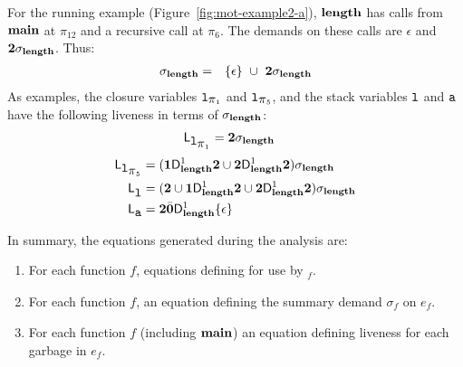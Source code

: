 \documentclass[9pt]{sigplanconf}
\begin{document}


For  the  running  example (Figure~\ref{fig:mot-example2-a}),  $\mathbf{length}$  has  calls  from  $\mathbf{main}$  at
$\pi_{12}$ and a recursive call at $\pi_6$. The demands on these calls
are $\epsilon$ and ${\mathbf{2}}\sigma_{\mathit{\mathbf{length}}}$. Thus:
\begin{eqnarray*}
\sigma_{\mathbf{length}}    &=&
 \{\epsilon\}  ~\cup~{{\mathbf{2}}\sigma_{\mathit{\mathbf{length}}}}
\end{eqnarray*}
As examples, the closure variables $\mbox{\tt l}_{\mbox{$\pi$}_1}$ and $\mbox{\tt l}_{\mbox{$\pi$}_5}$, and the
stack variables $\mbox{\tt l}$ and $\mbox{\tt a}$ have the following liveness in terms
of  $\sigma_{\mathbf{length}}$:
\begin{align*}
  \mathsf{L}_{\mbox{\tt l}_{\mbox{$\pi$}_1}} &= {\mathbf{2}}\sigma_{\mathit{\mathbf{length}}} 
\end{align*}
\begin{align*}
  \mathsf{L}_{\mbox{\tt l}_{\mbox{$\pi$}_5}} &=  (\mathbf{1}\mathsf{D}_{\mathit {\mathbf{length}}}^{1}{{\mathbf{2}}} \cup
  {\mathbf{2}}\mathsf{D}_{\mathit {\mathbf{length}}}^{1}{{\mathbf{2}}}) \sigma_{\mathit{\mathbf{length}}} \\
  \mathsf{L}_{{\mbox{\tt l}}}^{} &= ({\mathbf{2}} \cup \mathbf{1}\mathsf{D}_{\mathit {\mathbf{length}}}^{1}{\mathbf{2}}
  \cup {\mathbf{2}}\mathsf{D}_{\mathit {\mathbf{length}}}^{1}{{\mathbf{2}}})\sigma_{\mathit{\mathbf{length}}} \\
  \mathsf{L}_{{\mbox{\tt a}}}^{} &= {\mathbf{2}} \bar{\mathbf{0}} \mathsf{D}_{\mathit {\mathbf{length}}}^{1}\{\epsilon\}
\end{align*}

In  summary, the  equations  generated during the
analysis are:
\begin{enumerate}
\item   For  each   function  $\mathit{f}$,   equations
  defining  for use by \Lfonly$_{\mathit f}$.
\item For each function $\mathit{f}$, an equation defining the summary
  demand $\sigma_{\mathit f}$ on $e_f$.
\item   For  each   function  $\mathit{f}$   (including
  $\mathbf{main}$) an  equation  defining
  liveness for each garbage in  $e_{\mathit f}$.
\end{enumerate}
\end{document}

